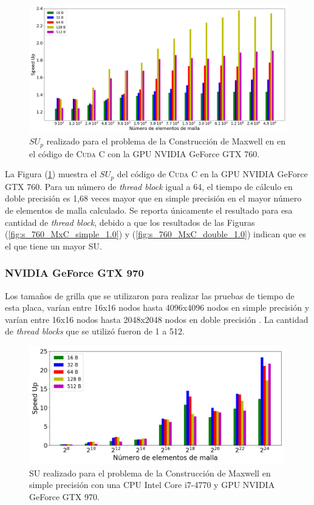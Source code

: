 \begin{figure}[h!]
	\centering
	\includegraphics[width=\textwidth]{figs_2/cap4/c_760_MxC_cuda_10}
	\caption{$SU_p$ realizado para el problema de la Construcción de Maxwell en en el código de \textsc{Cuda C} con la GPU NVIDIA GeForce GTX 760.} 
	\label{fig:c_760_MxC_cuda_10}	
\end{figure}

La Figura (\ref{fig:c_760_MxC_cuda_10}) muestra el ${SU}_p$ del código de \textsc{Cuda C} en la GPU NVIDIA GeForce GTX 760. Para un número de \textit{thread block} igual a 64, el tiempo de cálculo en doble precisión es 1,68 veces mayor que en simple precisión en el mayor número de elementos de malla calculado. Se reporta únicamente el resultado para esa cantidad de \textit{thread block}, debido a que los resultados de las Figuras (\ref{fig:s_760_MxC_simple_1.0}) y (\ref{fig:s_760_MxC_double_1.0}) indican que es el que tiene un mayor SU.


\subsubsection{NVIDIA GeForce GTX 970}

Los tamaños de grilla que se utilizaron para realizar las pruebas de tiempo de esta placa, varían entre 16x16 nodos hasta 4096x4096 nodos en simple precisión y varían entre 16x16 nodos hasta 2048x2048 nodos en doble precisión . La cantidad de \textit{thread blocks} que se utilizó fueron de 1 a 512.



\begin{figure}[htbp]
	\centering
	\includegraphics[width=0.99\textwidth]{figs_2/cap4/s_970_MxC_simple_10}
	\caption{SU realizado para el problema de la Construcción de Maxwell en simple precisión con una CPU Intel Core i7-4770 y GPU NVIDIA GeForce GTX 970.} 
	\label{fig:s_970_MxC_simple_10}	
\end{figure}

